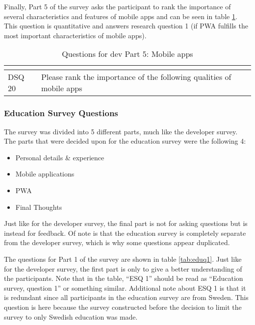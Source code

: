 \documentclass[a4paper,12pt]{article}
\begin{document}
Finally, Part 5 of the survey asks the participant to rank the importance of several characteristics and features of mobile apps and can be seen in table \ref{tab:devq5}. This question is quantitative and answers research question 1 (if PWA fulfills the most important characteristics of mobile apps).

\begin{table}[h!]
\centering
{}
\begin{tabular}{|l|l|}
\hline
\rowcolor[HTML]{656565} 
\multicolumn{1}{|c|}{\cellcolor[HTML]{656565}{\color[HTML]{FFFFFF} Number}} & \multicolumn{1}{l|}{\cellcolor[HTML]{656565}{\color[HTML]{FFFFFF} Question}} \\ \hline
DSQ 20 & Please rank the importance of the following qualities of mobile apps  \\
\hline
\end{tabular}
\caption{Questions for dev Part 5: Mobile apps}
\label{tab:devq5}
\end{table}

\subsubsection{Education Survey Questions}
The survey was divided into 5 different parts, much like the developer survey. The parts that were decided upon for the education survey were the following 4:

\begin{itemize}
    \item Personal details \& experience
    \item Mobile applications
    \item PWA
    \item Final Thoughts
\end{itemize}

Just like for the developer survey, the final part is not for asking questions but is instead for feedback. Of note is that the education survey is completely separate from the developer survey, which is why some questions appear duplicated. 

The questions for Part 1 of the survey are shown in table \ref{tab:eduq1}. Just like for the developer survey, the first part is only to give a better understanding of the participants. Note that in the table, “ESQ 1” should be read as “Education survey, question 1” or something similar. Additional note about ESQ 1 is that it is redundant since all participants in the education survey are from Sweden. This question is here because the survey constructed before the decision to limit the survey to only Swedish education was made.
\end{document}
